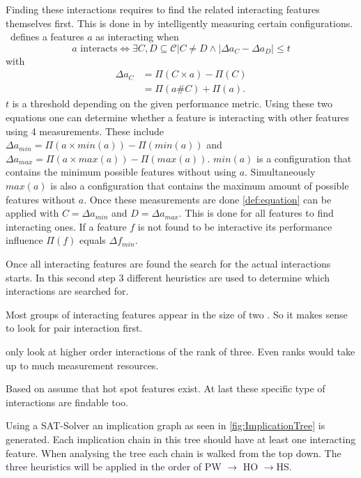 Finding these interactions requires to find the related interacting features themselves first.
This is done in by intelligently measuring certain configurations. \AFID~defines a features $a$ as interacting when
\begin{equation}\label{def:equation}
a \text{ interacts} \Leftrightarrow \exists C,D \subseteq \mathcal{C}| C \neq D  \land	 |\Delta a_C - \Delta a_D| \leq t
\end{equation}
with 
\begin{equation}
\begin{split}
\Delta a_C &= \Pi(C\times a) - \Pi(C)\\
&=\Pi(a\# C) + \Pi(a).
\end{split}
\end{equation}
$t$ is a threshold depending on the given performance metric.
Using these two equations one can determine whether a feature is interacting with other features using 4 measurements.
These include $\Delta a_{min} = \Pi(a \times min(a)) - \Pi(min(a))$ and $\Delta a_{max} = \Pi(a \times max(a)) - \Pi(max(a))$. $min(a)$ is a configuration that contains the minimum possible features without using $a$. Simultaneously $max(a)$ is also a configuration that contains the maximum amount of possible features without $a$. 
Once these measurements are done \cref{def:equation} can be applied with $C=\Delta a_{min}$ and $D=\Delta a_{max}$. This is done for all features to find interacting ones.
If a feature $f$ is not found to be interactive its performance influence  $\Pi(f)$ equals $\Delta f_{min}$.


Once all interacting features are found the search for the actual interactions starts. In this second step 3 different heuristics are used to determine which interactions are searched for.
 
 \newcommand{\oitem}[2]{{\item[{\parbox[t][0pt][t]{\leftmargin}{\raggedleft #1}}] {\parbox[t]{\textwidth-\leftmargin}{#2}}}}
 \begin{itemize}[leftmargin=4cm]
 	\setlength\itemsep{1em}
 	\oitem{Pair-Wise~Heuristik (PW):\label{lab:PW}}{ Most groups of interacting features appear in the size of two \cite{AutomatedFeatureDetectionSiegmund2012,AnalysisOfTheVariabilityInFortyPreprocessor_BasedSPLLiebig}. So it makes sense to look for pair interaction first.}
 	\oitem{Higher-Order Interactions Heuristic (HO):\label{lab:HO}}{
 		\citet{AutomatedFeatureDetectionSiegmund2012} only look at higher order interactions of the rank of three. Even ranks would take up to much measurement resources.
 	}
 	\oitem{Hot-Spot Features (HS):\label{lab:HS}}{
 		Based on \cite{FeatureCohesioninSPL, CanWeAvoidHighCoupling?} \citet{AutomatedFeatureDetectionSiegmund2012} assume that hot spot features exist. At last these specific type of interactions are findable too.
 	}
 \end{itemize}
Using a SAT-Solver an implication graph as seen in \autoref{fig:ImplicationTree} is generated. Each implication chain in this tree should have at least one interacting feature. When analysing the tree each chain is walked from the top down. The three heuristics will be applied in the order of PW $\rightarrow$ HO $\rightarrow$HS.  

